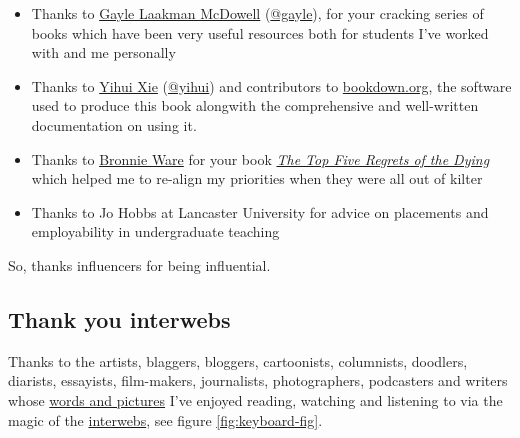 \documentclass[
]{book}
\providecommand{\tightlist}{%
  \setlength{\itemsep}{0pt}\setlength{\parskip}{0pt}}
\begin{document}
\begin{itemize}
\tightlist
\item
  Thanks to \href{https://en.wikipedia.org/wiki/Gayle_Laakmann_McDowell}{Gayle Laakman McDowell} (\href{https://twitter.com/gayle}{@gayle}), for your cracking series of books \citep{techcareer, cracking, crackingpm, crackingthepmcareer} which have been very useful resources both for students I've worked with and me personally
\item
  Thanks to \href{https://en.wikipedia.org/wiki/Yihui_Xie}{Yihui Xie} (\href{https://github.com/yihui}{@yihui}) and contributors to \href{https://bookdown.org}{bookdown.org}, the software used to produce this book alongwith the comprehensive and well-written documentation on using it. \citep{xie2017, xie2015, xie2020}
\item
  Thanks to \href{https://en.wikipedia.org/wiki/Bronnie_Ware}{Bronnie Ware} for your book \emph{\href{https://en.wikipedia.org/wiki/The_Top_Five_Regrets_of_the_Dying}{The Top Five Regrets of the Dying}} \citep{regrets} which helped me to re-align my priorities when they were all out of kilter
\item
  Thanks to Jo Hobbs at Lancaster University for advice on placements and employability in undergraduate teaching
\end{itemize}

So, thanks influencers for being influential. 🙏

\hypertarget{bloggers}{%
\subsection{Thank you interwebs}\label{bloggers}}

Thanks to the artists, blaggers, bloggers, cartoonists, columnists, doodlers, diarists, essayists, film-makers, journalists, photographers, podcasters and writers whose \href{https://en.wikipedia.org/wiki/Words_and_Pictures_(TV_programme)}{words and pictures} I've enjoyed reading, watching and listening to via the magic of the \href{https://en.wiktionary.org/wiki/interweb}{interwebs}, see figure \ref{fig:keyboard-fig}.
\end{document}
